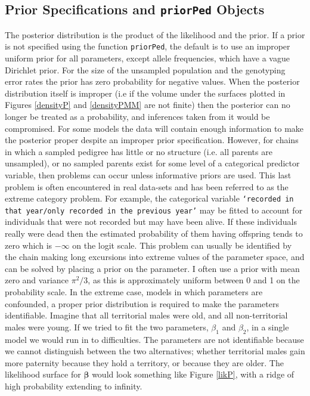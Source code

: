 \documentclass{article}
\begin{document}
\subsection{Prior Specifications and \texttt{priorPed} Objects}
\label{prior-sec}

The posterior distribution is the product of the likelihood and the prior. If a prior is not specified using the function \texttt{priorPed}, the default is to use an improper uniform prior for all parameters, except allele frequencies, which have a vague Dirichlet prior. For the size of the unsampled population and the genotyping error rates the prior has zero probability for negative values.  When the posterior distribution itself is improper (i.e if the volume under the surfaces plotted in Figures \ref{densityP} and \ref{densityPMM} are not finite) then the posterior can no longer be treated as a probability, and inferences taken from it would be compromised.  For some models the data will contain enough information to make the posterior proper despite an improper prior specification. However, for chains in which a sampled pedigree has little or no structure (i.e. all parents are unsampled), or no sampled parents exist for some level of a categorical predictor variable, then problems can occur unless informative priors are used. This last problem is often encountered in real data-sets and has been referred to as the extreme category problem.  For example, the categorical variable \texttt{`recorded in that year/only recorded in the previous year'} may be fitted to account for individuals that were not recorded but may have been alive.  If these individuals really were dead then the estimated probability of them having offspring tends to zero which is $-\infty$ on the logit scale.  This problem can usually be identified by the chain making long excursions into extreme values of the parameter space, and can be solved by placing a prior on the parameter. I often use a prior with mean zero and variance $\pi^{2}/3$, as this is approximately uniform between 0 and 1 on the probability scale.  In the extreme case, models in which parameters are confounded, a proper prior distribution is required to make the parameters identifiable.  Imagine that all territorial males were old, and all non-territorial males were young. If we tried to fit the two parameters, $\beta_{1}$ and $\beta_{2}$, in a single model we would run in to difficulties.  The parameters are not identifiable because we cannot distinguish between the two alternatives; whether territorial males gain more paternity because they hold a territory, or because they are older.  The likelihood surface for $\bm{\beta}$ would look something like Figure \ref{likP}, with a ridge of high probability extending to infinity.\\  
\end{document}
